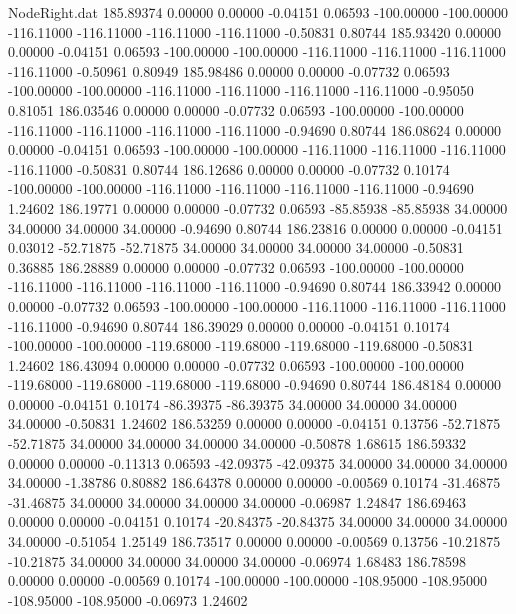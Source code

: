 \begin{filecontents}{NodeRight.dat}
 185.89374    0.00000    0.00000    -0.04151    0.06593 -100.00000 -100.00000 -116.11000 -116.11000 -116.11000 -116.11000   -0.50831    0.80744
 185.93420    0.00000    0.00000    -0.04151    0.06593 -100.00000 -100.00000 -116.11000 -116.11000 -116.11000 -116.11000   -0.50961    0.80949
 185.98486    0.00000    0.00000    -0.07732    0.06593 -100.00000 -100.00000 -116.11000 -116.11000 -116.11000 -116.11000   -0.95050    0.81051
 186.03546    0.00000    0.00000    -0.07732    0.06593 -100.00000 -100.00000 -116.11000 -116.11000 -116.11000 -116.11000   -0.94690    0.80744
 186.08624    0.00000    0.00000    -0.04151    0.06593 -100.00000 -100.00000 -116.11000 -116.11000 -116.11000 -116.11000   -0.50831    0.80744
 186.12686    0.00000    0.00000    -0.07732    0.10174 -100.00000 -100.00000 -116.11000 -116.11000 -116.11000 -116.11000   -0.94690    1.24602
 186.19771    0.00000    0.00000    -0.07732    0.06593  -85.85938  -85.85938   34.00000   34.00000   34.00000   34.00000   -0.94690    0.80744
 186.23816    0.00000    0.00000    -0.04151    0.03012  -52.71875  -52.71875   34.00000   34.00000   34.00000   34.00000   -0.50831    0.36885
 186.28889    0.00000    0.00000    -0.07732    0.06593 -100.00000 -100.00000 -116.11000 -116.11000 -116.11000 -116.11000   -0.94690    0.80744
 186.33942    0.00000    0.00000    -0.07732    0.06593 -100.00000 -100.00000 -116.11000 -116.11000 -116.11000 -116.11000   -0.94690    0.80744
 186.39029    0.00000    0.00000    -0.04151    0.10174 -100.00000 -100.00000 -119.68000 -119.68000 -119.68000 -119.68000   -0.50831    1.24602
 186.43094    0.00000    0.00000    -0.07732    0.06593 -100.00000 -100.00000 -119.68000 -119.68000 -119.68000 -119.68000   -0.94690    0.80744
 186.48184    0.00000    0.00000    -0.04151    0.10174  -86.39375  -86.39375   34.00000   34.00000   34.00000   34.00000   -0.50831    1.24602
 186.53259    0.00000    0.00000    -0.04151    0.13756  -52.71875  -52.71875   34.00000   34.00000   34.00000   34.00000   -0.50878    1.68615
 186.59332    0.00000    0.00000    -0.11313    0.06593  -42.09375  -42.09375   34.00000   34.00000   34.00000   34.00000   -1.38786    0.80882
 186.64378    0.00000    0.00000    -0.00569    0.10174  -31.46875  -31.46875   34.00000   34.00000   34.00000   34.00000   -0.06987    1.24847
 186.69463    0.00000    0.00000    -0.04151    0.10174  -20.84375  -20.84375   34.00000   34.00000   34.00000   34.00000   -0.51054    1.25149
 186.73517    0.00000    0.00000    -0.00569    0.13756  -10.21875  -10.21875   34.00000   34.00000   34.00000   34.00000   -0.06974    1.68483
 186.78598    0.00000    0.00000    -0.00569    0.10174 -100.00000 -100.00000 -108.95000 -108.95000 -108.95000 -108.95000   -0.06973    1.24602

\end{filecontents}
